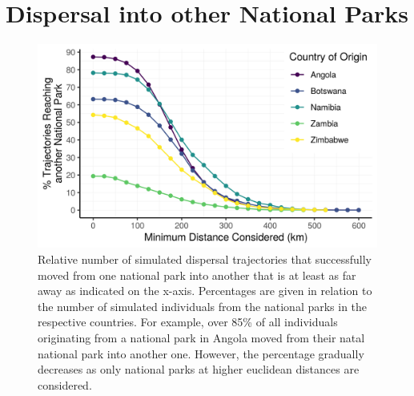 \documentclass[abstract=off,10pt,a4paper,bibliography=totocnumbered]{article}
\begin{document}
\section{Dispersal into other National Parks}
\begin{figure}[hbtp]
 \begin{center}
  \includegraphics[width = \textwidth]{99_AreasReached.png}
  \caption{Relative number of simulated dispersal trajectories that successfully
  moved from one national park into another that is at least as far away as
  indicated on the x-axis. Percentages are given in relation to the number of
  simulated individuals from the national parks in the respective countries. For
  example, over 85\% of all individuals originating from a national park in
  Angola moved from their natal national park into another one. However, the
  percentage gradually decreases as only national parks at higher euclidean
  distances are considered.}
  \label{AreasReached}
 \end{center}
\end{figure}

\newpage
\end{document}
